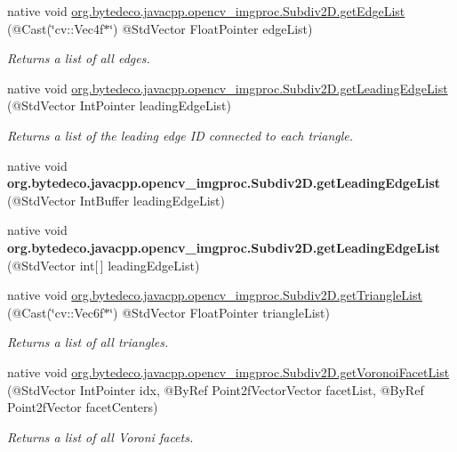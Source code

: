 \begin{DoxyCompactItemize}
\item 
native void \hyperlink{group__imgproc_ga8171761378651c75f5e8ed774c54fa55}{org.\+bytedeco.\+javacpp.\+opencv\+\_\+imgproc.\+Subdiv2\+D.\+get\+Edge\+List} (@Cast(\char`\"{}cv\+::\+Vec4f$\ast$\char`\"{}) @Std\+Vector Float\+Pointer edge\+List)
\begin{DoxyCompactList}\small\item\em Returns a list of all edges. \end{DoxyCompactList}\item 
native void \hyperlink{group__imgproc_gaf905b455bec0add07a982c747aa0462b}{org.\+bytedeco.\+javacpp.\+opencv\+\_\+imgproc.\+Subdiv2\+D.\+get\+Leading\+Edge\+List} (@Std\+Vector Int\+Pointer leading\+Edge\+List)
\begin{DoxyCompactList}\small\item\em Returns a list of the leading edge ID connected to each triangle. \end{DoxyCompactList}\item 
\mbox{\label{group__imgproc_ga5dd426d3548159a265eead612191d0e9}} 
native void {\bfseries org.\+bytedeco.\+javacpp.\+opencv\+\_\+imgproc.\+Subdiv2\+D.\+get\+Leading\+Edge\+List} (@Std\+Vector Int\+Buffer leading\+Edge\+List)
\item 
\mbox{\label{group__imgproc_gafd08ab27fce167fe6aa9d7da2e3b6218}} 
native void {\bfseries org.\+bytedeco.\+javacpp.\+opencv\+\_\+imgproc.\+Subdiv2\+D.\+get\+Leading\+Edge\+List} (@Std\+Vector int\mbox{[}$\,$\mbox{]} leading\+Edge\+List)
\item 
native void \hyperlink{group__imgproc_ga030c644089d5d56227b9546d06c12dcf}{org.\+bytedeco.\+javacpp.\+opencv\+\_\+imgproc.\+Subdiv2\+D.\+get\+Triangle\+List} (@Cast(\char`\"{}cv\+::\+Vec6f$\ast$\char`\"{}) @Std\+Vector Float\+Pointer triangle\+List)
\begin{DoxyCompactList}\small\item\em Returns a list of all triangles. \end{DoxyCompactList}\item 
native void \hyperlink{group__imgproc_ga3f67d6d59372cbe845eda2627aa4889f}{org.\+bytedeco.\+javacpp.\+opencv\+\_\+imgproc.\+Subdiv2\+D.\+get\+Voronoi\+Facet\+List} (@Std\+Vector Int\+Pointer idx, @By\+Ref Point2f\+Vector\+Vector facet\+List, @By\+Ref Point2f\+Vector facet\+Centers)
\begin{DoxyCompactList}\small\item\em Returns a list of all Voroni facets. \end{DoxyCompactList}\item 

\end{DoxyCompactItemize}
